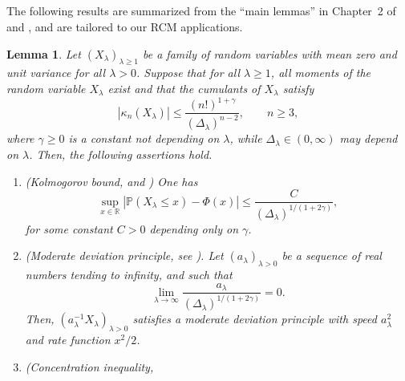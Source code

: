 \documentclass[bj,authoryear,noshowframe]{imsart}
\theoremstyle{plain}
\newtheorem{lemma}[theorem]{Lemma}
\theoremstyle{remark}
\newcommand{\IP}{\mathbb{P}}
\newcommand{\R}{\mathbb{R}}
\begin{document}
\begin{appendix}
\section*{}\label{appn} %
\noindent 
The following results are summarized from the ``main lemmas'' in Chapter~2 of \cite{saulis} and \cite{doring}, and are tailored to our RCM applications.
\begin{lemma}
  \label{l1}
  Let $(X_\lambda)_{\lambda \geq 1}$ be a family of random variables with mean zero and unit variance for all $\lambda>0$. Suppose that for all $\lambda \geq 1$, all moments of the random variable $X_\lambda$ exist and that %
  the cumulants of $X_\lambda$ satisfy  
  \begin{equation}
    \label{Statuleviciuscond2}
    |\kappa_n (X_\lambda)|\le\frac{(n!)^{1+\gamma}}{(\Delta_\lambda)^{n-2}},
    \qquad
 n\ge3, 
\end{equation}
  where $\gamma\ge0$ is a constant not depending on $\lambda$, while $\Delta_\lambda\in(0,\infty)$ may depend on $\lambda$.
   Then, the following assertions hold.
\begin{enumerate} %
\item (Kolmogorov bound,
 \cite[Corollary~2.1]{saulis} and \cite[Theorem~2.4]{doering})
  One has
\begin{equation}
\sup_{x\in\R}|\IP(X_\lambda\leq x)-\Phi(x)|\leq \frac{C}{(\Delta_\lambda)^{1/(1+2\gamma)}},
\end{equation}
for some constant $C>0$ depending only on $\gamma$.
\item (Moderate deviation principle,
  see \cite[Theorem~1.1]{doring}).
  Let $( a_\lambda )_{\lambda > 0}$ be a sequence of real numbers tending to infinity, and such that 
  $$
  \lim_{\lambda \to \infty}
  \frac{a_\lambda}{(\Delta_\lambda)^{1/(1+2\gamma)}}
  = 0.
  $$
  Then, $ (a_\lambda^{-1}X_\lambda)_{\lambda >0}$ satisfies a moderate deviation principle with speed $a_\lambda^2$ and rate function $x^2/2$. 
\item (Concentration inequality,

\end{enumerate}
\end{lemma}
\end{appendix}
\end{document}
